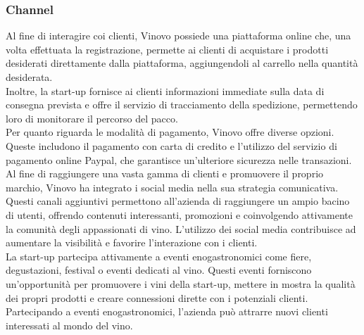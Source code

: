 \documentclass[12pt, a4paper]{article}
\newcommand{\meskip}{\medskip \\}
\begin{document}
\subsubsection{Channel}
Al fine di interagire coi clienti, Vinovo possiede una piattaforma online che, una volta effettuata la registrazione, permette ai clienti di acquistare i prodotti desiderati direttamente dalla piattaforma, aggiungendoli al carrello nella quantità desiderata.\\
Inoltre, la start-up fornisce ai clienti informazioni immediate sulla data di consegna prevista e offre il servizio di tracciamento della spedizione, permettendo loro di monitorare il percorso del pacco.\\
Per quanto riguarda le modalità di pagamento, Vinovo offre diverse opzioni. Queste includono il pagamento con carta di credito e l'utilizzo del servizio di pagamento online Paypal, che garantisce un'ulteriore sicurezza nelle transazioni.\\
Al fine di raggiungere una vasta gamma di clienti e promuovere il proprio marchio, Vinovo ha integrato i social media nella sua strategia comunicativa. Questi canali aggiuntivi permettono all'azienda di raggiungere un ampio bacino di utenti, offrendo contenuti interessanti, promozioni e coinvolgendo attivamente la comunità degli appassionati di vino. L'utilizzo dei social media contribuisce ad aumentare la visibilità e favorire l'interazione con i clienti.\meskip
La start-up partecipa attivamente a eventi enogastronomici come fiere, degustazioni, festival o eventi dedicati al vino. Questi eventi forniscono un'opportunità per promuovere i vini della start-up, mettere in mostra la qualità dei propri prodotti e creare connessioni dirette con i potenziali clienti. Partecipando a eventi enogastronomici, l'azienda può attrarre nuovi clienti interessati al mondo del vino.
\end{document}
